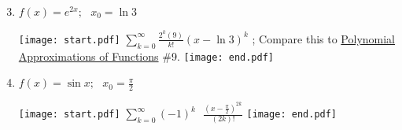 \documentclass[12pt]{article}
\begin{document}
\begin{enumerate}
\setcounter{enumi}{2}

\item $f(x)=e^{2x}; \text{   } x_0=\ln{3}$

\texttt{[image: start.pdf]}
{{$\sum_{k=0}^{\infty}{\frac{2^k(9)}{k!} (x-\ln{3})^k}$ ; Compare this to \underline{Polynomial Approximations of Functions} \#9.  }}
\texttt{[image: end.pdf]}


\item $f(x)=\sin{x}; \text{   } x_0=\frac{\pi}{2}$

\texttt{[image: start.pdf]}
{{$\sum_{k=0}^{\infty}{(-1)^{k} \text{ } \frac{\left(x-\frac{\pi}{2}\right)^{2k}}{(2k)!}}$}}
\texttt{[image: end.pdf]}


\end{enumerate}
\end{document}
